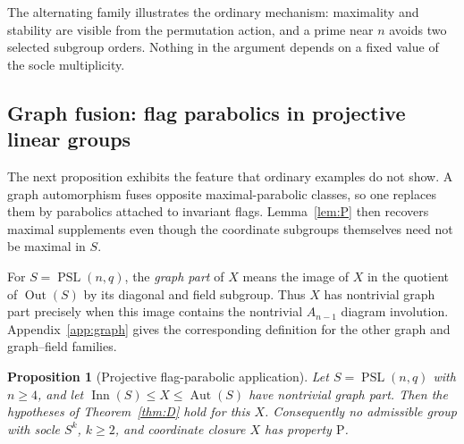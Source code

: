 \documentclass[11pt]{amsart}
\newtheorem{proposition}[theorem]{Proposition}
\theoremstyle{definition}
\theoremstyle{remark}
\DeclareMathOperator{\Inn}{Inn}
\DeclareMathOperator{\Aut}{Aut}
\DeclareMathOperator{\Out}{Out}
\DeclareMathOperator{\PSL}{PSL}
\begin{document}
The alternating family illustrates the ordinary mechanism: maximality and
stability are visible from the permutation action, and a prime near $n$
avoids two selected subgroup orders. Nothing in the argument depends on a
fixed value of the socle multiplicity.

\subsection{Graph fusion: flag parabolics in projective linear groups}

The next proposition exhibits the feature that ordinary examples do not show.
A graph automorphism fuses opposite maximal-parabolic classes, so one replaces
them by parabolics attached to invariant flags. Lemma~\ref{lem:P} then recovers
maximal supplements even though the coordinate subgroups themselves need not
be maximal in $S$.

For $S=\PSL(n,q)$, the \emph{graph part} of $X$ means the image of $X$ in
the quotient of $\Out(S)$ by its diagonal and field subgroup. Thus $X$ has
nontrivial graph part precisely when this image contains the nontrivial
$A_{n-1}$ diagram involution. Appendix~\ref{app:graph} gives the corresponding
definition for the other graph and graph--field families.

\begin{proposition}[Projective flag-parabolic application]
\label{prop:psl-flag}
Let $S=\PSL(n,q)$ with $n\geq4$, and let
$\Inn(S)\leq X\leq\Aut(S)$ have nontrivial graph part. Then the hypotheses of
Theorem~\ref{thm:D} hold for this $X$. Consequently no admissible group with
socle $S^k$, $k\geq2$, and coordinate closure $X$ has property $\mathrm{P}$.
\end{proposition}
\end{document}
